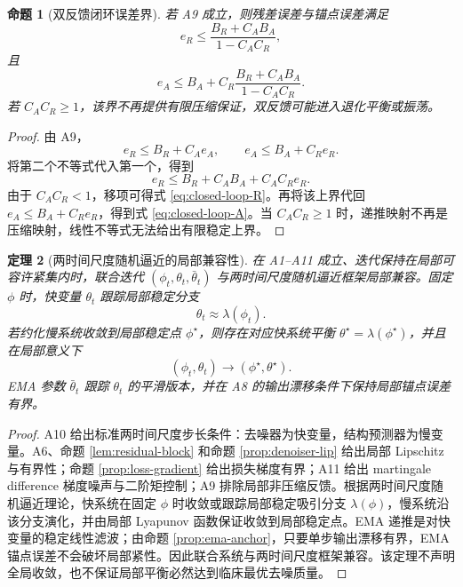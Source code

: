 \documentclass[11pt,a4paper,UTF8,fontset=fandol]{ctexart}
\newtheorem{theorem}{定理}[section]
\newtheorem{proposition}[theorem]{命题}
\theoremstyle{definition}
\begin{document}
\begin{proposition}[双反馈闭环误差界]
\label{prop:closed-loop}
若 A9 成立，则残差误差与锚点误差满足
\begin{equation}
\label{eq:closed-loop-R}
    e_R
    \le
    \frac{B_R+C_AB_A}{1-C_AC_R},
\end{equation}
且
\begin{equation}
\label{eq:closed-loop-A}
    e_A
    \le
    B_A+
    C_R\frac{B_R+C_AB_A}{1-C_AC_R}.
\end{equation}
若 $C_AC_R\ge1$，该界不再提供有限压缩保证，双反馈可能进入退化平衡或振荡。
\end{proposition}

\begin{proof}
由 A9，
\begin{equation}
    e_R\le B_R+C_Ae_A,
    \qquad
    e_A\le B_A+C_Re_R.
\end{equation}
将第二个不等式代入第一个，得到
\begin{equation}
    e_R\le B_R+C_AB_A+C_AC_Re_R.
\end{equation}
由于 $C_AC_R<1$，移项可得式 \eqref{eq:closed-loop-R}。再将该上界代回 $e_A\le B_A+C_Re_R$，得到式 \eqref{eq:closed-loop-A}。当 $C_AC_R\ge1$ 时，递推映射不再是压缩映射，线性不等式无法给出有限稳定上界。
\end{proof}

\begin{theorem}[两时间尺度随机逼近的局部兼容性]
\label{thm:two-timescale}
在 A1--A11 成立、迭代保持在局部可容许紧集内时，联合迭代 $(\phi_t,\theta_t,\bar\theta_t)$ 与两时间尺度随机逼近框架局部兼容。固定 $\phi$ 时，快变量 $\theta_t$ 跟踪局部稳定分支
\begin{equation}
    \theta_t\approx\lambda(\phi_t).
\end{equation}
若约化慢系统收敛到局部稳定点 $\phi^\star$，则存在对应快系统平衡 $\theta^\star=\lambda(\phi^\star)$，并且在局部意义下
\begin{equation}
    (\phi_t,\theta_t)\to(\phi^\star,\theta^\star).
\end{equation}
EMA 参数 $\bar\theta_t$ 跟踪 $\theta_t$ 的平滑版本，并在 A8 的输出漂移条件下保持局部锚点误差有界。
\end{theorem}

\begin{proof}
A10 给出标准两时间尺度步长条件：去噪器为快变量，结构预测器为慢变量。A6、命题 \ref{lem:residual-block} 和命题 \ref{prop:denoiser-lip} 给出局部 Lipschitz 与有界性；命题 \ref{prop:loss-gradient} 给出损失梯度有界；A11 给出 martingale difference 梯度噪声与二阶矩控制；A9 排除局部非压缩反馈。根据两时间尺度随机逼近理论，快系统在固定 $\phi$ 时收敛或跟踪局部稳定吸引分支 $\lambda(\phi)$，慢系统沿该分支演化，并由局部 Lyapunov 函数保证收敛到局部稳定点。EMA 递推是对快变量的稳定线性滤波；由命题 \ref{prop:ema-anchor}，只要单步输出漂移有界，EMA 锚点误差不会破坏局部紧性。因此联合系统与两时间尺度框架兼容。该定理不声明全局收敛，也不保证局部平衡必然达到临床最优去噪质量。
\end{proof}
\end{document}
